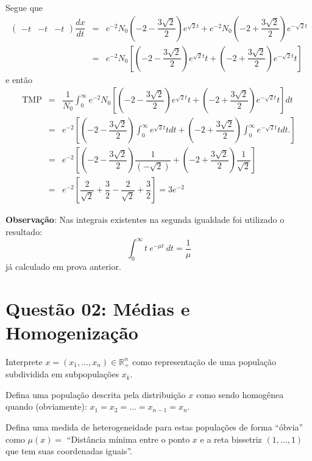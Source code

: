 Segue que
\[\begin{array}{rcl}
\left(\begin{array}{ccc} -t & -t & -t \end{array}\right) \dfrac{dx}{dt}
&=& e^{-2}N_{0} \left( - 2 - \dfrac{3\sqrt{2}}{2} \right) e^{\sqrt{2}t} + e^{-2}N_{0} \left(-2 + \dfrac{3\sqrt{2}}{2} \right)e^{-\sqrt{2}t} \\[0.5cm]
&=& e^{-2}N_{0} \left[ \left( - 2 - \dfrac{3\sqrt{2}}{2} \right)e^{\sqrt{2}t}t + \left( - 2 + \dfrac{3\sqrt{2}}{2} \right)e^{-\sqrt{2}t}t \right]
\end{array}\]
e então 
\[\begin{array}{rcl}
\operatorname{TMP}
&=& \dfrac{1}{N_{0}} \displaystyle\int_{0}^{\infty} e^{-2}N_{0} \left[ \left( - 2 - \dfrac{3\sqrt{2}}{2} \right)e^{\sqrt{2}t}t + \left( - 2 + \dfrac{3\sqrt{2}}{2} \right)e^{-\sqrt{2}t}t \right] dt
\\[0.5cm]
&=& e^{-2}\left[ \left( - 2 - \dfrac{3\sqrt{2}}{2} \right) \displaystyle\int_{0}^{\infty} e^{\sqrt{2}t}t dt + \left( - 2 + \dfrac{3\sqrt{2}}{2} \right) \displaystyle\int_{0}^{\infty} e^{-\sqrt{2}t}t dt. \right] 
\\[0.5cm]
&=& e^{-2}\left[ \left( - 2 - \dfrac{3\sqrt{2}}{2} \right) \dfrac{1}{(-\sqrt{2})} + \left( - 2 + \dfrac{3\sqrt{2}}{2} \right) \dfrac{1}{\sqrt{2}} \right]
\\[0.5cm]
&=& e^{-2}\left[ \dfrac{2}{\sqrt{2}} + \dfrac{3}{2} - \dfrac{2}{\sqrt{2}} + \dfrac{3}{2}  \right]
= 3e^{-2}
\end{array}\]

\textbf{Observação}: Nas integrais existentes na segunda igualdade foi utilizado o resultado: \[\displaystyle\int_{0}^{\infty} t\ e^{-\mu t}\ dt = \dfrac{1}{\mu}\] já calculado em prova anterior.


\clearpage
\chapter*{Questão 02: Médias e Homogenização}

Interprete \(x = (x_1, \ldots, x_n) \in \mathbb{R}_+^n\) como representação de uma população subdividida em subpopulações \(x_k\).

Defina uma população descrita pela distribuição \(x\) como sendo homogênea quando (obviamente): \(x_1 = x_2 = \ldots = x_{n-1} = x_n\).

Defina uma medida de heterogeneidade para estas populações de forma ``óbvia'' como \(\mu(x) = \) ``Distância mínima entre o ponto \(x\) e a reta bissetriz \((1, \ldots, 1)\) que tem suas coordenadas iguais''.


